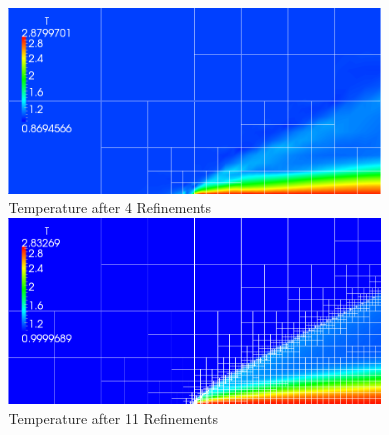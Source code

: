 \documentclass[18pt,xcolor=table]{beamer}
\begin{document}
\begin{frame}[t]
\begin{columns}
\begin{column}{0.49\textwidth}
\begin{figure}
\end{figure}
\end{column}
\begin{column}{0.49\textwidth}
\begin{figure}
\centering
\includegraphics[width=1.0\textwidth]{Motivation/PlateMovie/T4.png}\\
\vspace{-1ex}
{\scriptsize Temperature after 4 Refinements}\\
\vspace{1ex}
\includegraphics[width=1.0\textwidth]{Motivation/PlateMovie/T11.png}
\vspace{-1ex}
{\scriptsize Temperature after 11 Refinements}
\vspace{1ex}
\end{figure}
\end{column}
\end{columns}

\end{frame}
\end{document}
